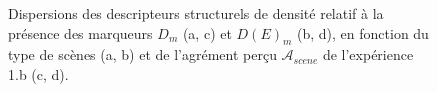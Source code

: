 \begin{figure}[t]
        \myfloatalign
        \par
       \caption{Dispersions des descripteurs structurels de densité relatif à la présence des marqueurs $D_m$ (a, c) et $D(E)_m$ (b, d), en fonction du type de scènes (a, b) et de l'agrément perçu $\mathcal{A}_{scene}$ de l'expérience 1.b (c, d).}\label{fig:densityMarker}
\end{figure}

